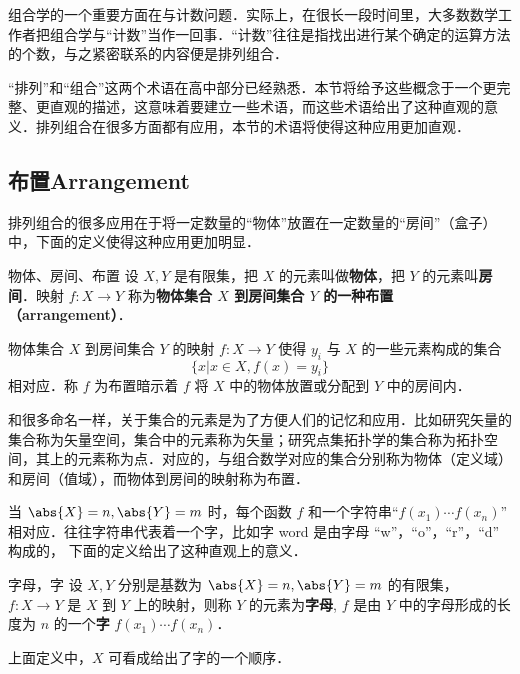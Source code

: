 
\begin{issues}
\issueDraft
\end{issues}

组合学的一个重要方面在与计数问题．实际上，在很长一段时间里，大多数数学工作者把组合学与“计数”当作一回事．“计数”往往是指找出进行某个确定的运算方法的个数，与之紧密联系的内容便是排列组合．

“排列”和“组合”这两个术语在高中部分已经熟悉．本节将给予这些概念于一个更完整、更直观的描述，这意味着要建立一些术语，而这些术语给出了这种直观的意义．排列组合在很多方面都有应用，本节的术语将使得这种应用更加直观．
\subsection{布置Arrangement}
排列组合的很多应用在于将一定数量的“物体”放置在一定数量的“房间”（盒子）中，下面的定义使得这种应用更加明显．
\begin{definition}{物体、房间、布置}\label{APC_def2}
设 $X,Y$ 是有限集，把 $X$ 的元素叫做\textbf{物体}，把 $Y$ 的元素叫\textbf{房间}．映射 $f:X\rightarrow Y$ 称为\textbf{物体集合 $X$ 到房间集合 $Y$ 的一种\textbf{布置}（arrangement）}．
\end{definition}
物体集合 $X$ 到房间集合 $Y$ 的映射 $f:X\rightarrow Y$ 使得 $y_i$ 与 $X$ 的一些元素构成的集合
\begin{equation}
\{x|x\in X,f(x)=y_i\}
\end{equation}
相对应．称 $f$ 为布置暗示着 $f$ 将 $X$ 中的物体放置或分配到 $Y$ 中的房间内．

和很多命名一样，关于集合的元素是为了方便人们的记忆和应用．比如研究矢量的集合称为矢量空间，集合中的元素称为矢量；研究点集拓扑学的集合称为拓扑空间，其上的元素称为点．对应的，与组合数学对应的集合分别称为物体（定义域）和房间（值域），而物体到房间的映射称为布置．

当 $\abs{X}=n,\abs{Y}=m$ 时，每个函数 $f$ 和一个字符串“$f(x_1)\cdots f(x_n)$” 相对应．往往字符串代表着一个字，比如字 word 是由字母 “w”，“o”，“r”，“d” 构成的， 下面的定义给出了这种直观上的意义．
\begin{definition}{字母，字}\label{APC_def1}
设 $X,Y$ 分别是基数为 $\abs{X}=n,\abs{Y}=m$ 的有限集， $f:X\rightarrow Y$ 是 $X$ 到 $Y$ 上的映射，则称 $Y$ 的元素为\textbf{字母}, $f$ 是由 $Y$ 中的字母形成的长度为 $n$ 的一个\textbf{字} $f(x_1)\cdots f(x_n)$．
\end{definition}
上面定义中，$X$ 可看成给出了字的一个顺序．

